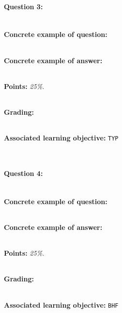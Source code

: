 \paragraph{Question 3: } \ \\

\textbf{Concrete example of question:} \textit{}

\ \\

\textbf{Concrete example of answer:} \textit{}

\ \\

\textbf{Points:} \textit{25\%.}

\ \\

\textbf{Grading:} \textit{}

\ \\

\textbf{Associated learning objective:} \texttt{TYP}

\ \\

\paragraph{Question 4: } \ \\

\textbf{Concrete example of question:} \textit{}

\ \\

\textbf{Concrete example of answer:} \textit{}

\ \\

\textbf{Points:} \textit{25\%.}

\ \\

\textbf{Grading:} \textit{}

\ \\

\textbf{Associated learning objective:} \texttt{BHF}

\ \\

